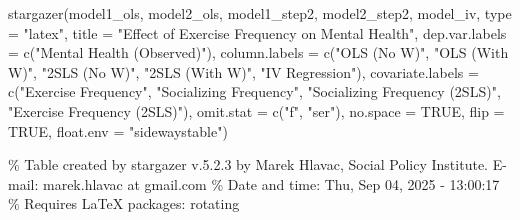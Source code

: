 \documentclass[
  letterpaper,
  DIV=11,
  numbers=noendperiod]{scrartcl}
\newenvironment{Shaded}{\begin{snugshade}}{\end{snugshade}}
\newcommand{\AttributeTok}[1]{\textcolor[rgb]{0.40,0.45,0.13}{#1}}
\newcommand{\ConstantTok}[1]{\textcolor[rgb]{0.56,0.35,0.01}{#1}}
\newcommand{\FunctionTok}[1]{\textcolor[rgb]{0.28,0.35,0.67}{#1}}
\newcommand{\NormalTok}[1]{\textcolor[rgb]{0.00,0.23,0.31}{#1}}
\newcommand{\StringTok}[1]{\textcolor[rgb]{0.13,0.47,0.30}{#1}}
\begin{document}
\begin{Shaded}
\begin{Highlighting}[]
\FunctionTok{stargazer}\NormalTok{(model1\_ols, model2\_ols, model1\_step2, model2\_step2, model\_iv, }
  \AttributeTok{type =} \StringTok{"latex"}\NormalTok{,}
  \AttributeTok{title =} \StringTok{"Effect of Exercise Frequency on Mental Health"}\NormalTok{,}
  \AttributeTok{dep.var.labels =} \FunctionTok{c}\NormalTok{(}\StringTok{"Mental Health (Observed)"}\NormalTok{),}
  \AttributeTok{column.labels =} \FunctionTok{c}\NormalTok{(}\StringTok{"OLS (No W)"}\NormalTok{, }\StringTok{"OLS (With W)"}\NormalTok{, }\StringTok{"2SLS (No W)"}\NormalTok{, }\StringTok{"2SLS (With W)"}\NormalTok{, }\StringTok{"IV Regression"}\NormalTok{),}
  \AttributeTok{covariate.labels =} \FunctionTok{c}\NormalTok{(}\StringTok{"Exercise Frequency"}\NormalTok{, }\StringTok{"Socializing Frequency"}\NormalTok{, }\StringTok{"Socializing Frequency (2SLS)"}\NormalTok{, }\StringTok{"Exercise Frequency (2SLS)"}\NormalTok{),}
  \AttributeTok{omit.stat =} \FunctionTok{c}\NormalTok{(}\StringTok{"f"}\NormalTok{, }\StringTok{"ser"}\NormalTok{),}
  \AttributeTok{no.space =} \ConstantTok{TRUE}\NormalTok{,}
  \AttributeTok{flip =} \ConstantTok{TRUE}\NormalTok{,}
  \AttributeTok{float.env =} \StringTok{"sidewaystable"}\NormalTok{)}
\end{Highlighting}
\end{Shaded}

\% Table created by stargazer v.5.2.3 by Marek Hlavac, Social Policy
Institute. E-mail: marek.hlavac at gmail.com \% Date and time: Thu, Sep
04, 2025 - 13:00:17 \% Requires LaTeX packages: rotating
\end{document}
